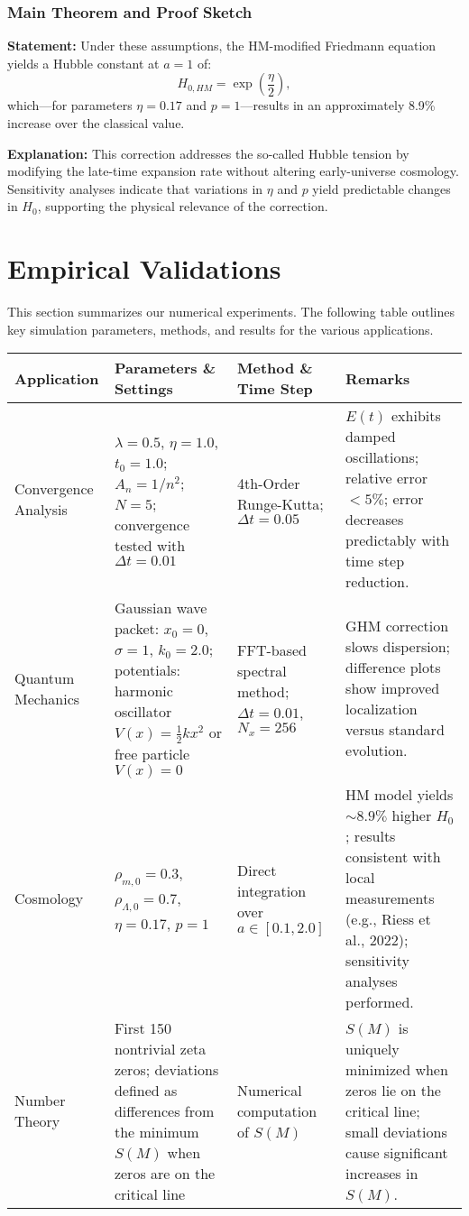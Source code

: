 \documentclass[11pt]{article}
\begin{document}
\subsubsection{Main Theorem and Proof Sketch}

\textbf{Statement:} Under these assumptions, the HM-modified Friedmann equation yields a Hubble constant at $a=1$ of:
\[
H_{0,HM}=\exp\left(\frac{\eta}{2}\right),
\]
which---for parameters $\eta=0.17$ and $p=1$---results in an approximately 8.9\% increase over the classical value.

\textbf{Explanation:} This correction addresses the so-called Hubble tension by modifying the late-time expansion rate without altering early-universe cosmology. Sensitivity analyses indicate that variations in $\eta$ and $p$ yield predictable changes in $H_0$, supporting the physical relevance of the correction.

\section{Empirical Validations}

This section summarizes our numerical experiments. The following table outlines key simulation parameters, methods, and results for the various applications.

\medskip

\begin{center}
\begin{tabular}{|l|l|l|p{6cm}|}
\hline
\textbf{Application} & \textbf{Parameters \& Settings} & \textbf{Method \& Time Step} & \textbf{Remarks} \\ \hline
Convergence Analysis & $\lambda=0.5$, $\eta=1.0$, $t_0=1.0$; $A_n=1/n^2$; $N=5$; convergence tested with $\Delta t=0.01$ & 4th-Order Runge-Kutta; $\Delta t=0.05$ & $E(t)$ exhibits damped oscillations; relative error $<5\%$; error decreases predictably with time step reduction. \\ \hline
Quantum Mechanics & Gaussian wave packet: $x_0=0$, $\sigma=1$, $k_0=2.0$; potentials: harmonic oscillator $V(x)=\frac{1}{2}kx^2$ or free particle $V(x)=0$ & FFT-based spectral method; $\Delta t=0.01$, $N_x=256$ & GHM correction slows dispersion; difference plots show improved localization versus standard evolution. \\ \hline
Cosmology & $\rho_{m,0}=0.3$, $\rho_{\Lambda,0}=0.7$, $\eta=0.17$, $p=1$ & Direct integration over $a\in[0.1,2.0]$ & HM model yields $\sim8.9\%$ higher $H_0$; results consistent with local measurements (e.g., Riess et al., 2022); sensitivity analyses performed. \\ \hline
Number Theory & First 150 nontrivial zeta zeros; deviations defined as differences from the minimum $S(M)$ when zeros are on the critical line & Numerical computation of $S(M)$ & $S(M)$ is uniquely minimized when zeros lie on the critical line; small deviations cause significant increases in $S(M)$. \\ \hline
\end{tabular}
\end{center}
\end{document}
